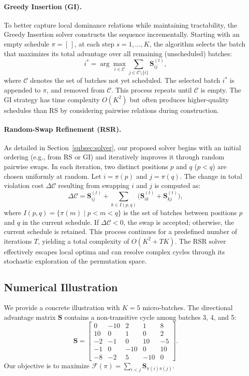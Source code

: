 \paragraph{Greedy Insertion (GI).} 
To better capture local dominance relations while maintaining tractability, the Greedy Insertion solver constructs the sequence incrementally. Starting with an empty schedule $\pi = [\,]$, at each step $s = 1, \dots, K$, the algorithm selects the batch that maximizes its total advantage over all remaining (unscheduled) batches:
\[
i^* = \arg\max_{i \in \mathcal{C}} \sum_{j \in \mathcal{C} \setminus \{i\}} \mathbf{S}^{(t)}_{ij},
\]
where $\mathcal{C}$ denotes the set of batches not yet scheduled. The selected batch $i^*$ is appended to $\pi$, and removed from $\mathcal{C}$. This process repeats until $\mathcal{C}$ is empty. The GI strategy has time complexity $O(K^2)$ but often produces higher-quality schedules than RS by considering pairwise relations during construction.

\paragraph{Random-Swap Refinement (RSR).}
As detailed in Section~\ref{subsec:solver}, our proposed solver begins with an initial ordering (e.g., from RS or GI) and iteratively improves it through random pairwise swaps. In each iteration, two distinct positions $p$ and $q$ ($p < q$) are chosen uniformly at random. Let $i = \pi(p)$ and $j = \pi(q)$. The change in total violation cost $\Delta\mathcal{C}$ resulting from swapping $i$ and $j$ is computed as:
\[
\Delta\mathcal{C} = \mathbf{S}^{(t)}_{ij} + \sum_{k \in I(p,q)} \bigl( \mathbf{S}^{(t)}_{ik} + \mathbf{S}^{(t)}_{kj} \bigr),
\]
where $I(p,q) = \{\pi(m) \mid p < m < q\}$ is the set of batches between positions $p$ and $q$ in the current schedule. If $\Delta\mathcal{C} < 0$, the swap is accepted; otherwise, the current schedule is retained. This process continues for a predefined number of iterations $T$, yielding a total complexity of $O(K^2 + TK)$. The RSR solver effectively escapes local optima and can resolve complex cycles through its stochastic exploration of the permutation space.

\subsection{Numerical Illustration}
\label{subsec:numerical_illustration}

We provide a concrete illustration with $K=5$ micro-batches. The directional advantage matrix $\mathbf{S}$ contains a non-transitive cycle among batches 3, 4, and 5:
\[
\mathbf{S} = \begin{bmatrix}
0 & -10 & 2 & 1 & 8 \\
10 & 0 & 1 & 0 & 2 \\
-2 & -1 & 0 & 10 & -5 \\
-1 & 0 & -10 & 0 & 10 \\
-8 & -2 & 5 & -10 & 0
\end{bmatrix}.
\]
Our objective is to maximize $\mathcal{F}(\pi) = \sum_{i < j} \mathbf{S}_{\pi(i)\pi(j)}$.

